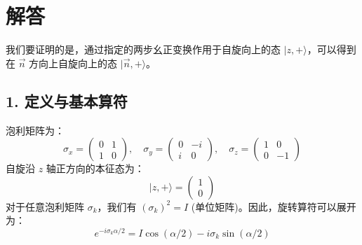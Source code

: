 \documentclass{article}
\begin{document}
\section*{解答}
我们要证明的是，通过指定的两步幺正变换作用于自旋向上的态 \(|z,+\rangle\)，可以得到在 \(\vec{n}\) 方向上自旋向上的态 \(|\vec{n},+\rangle\)。
\subsection*{1. 定义与基本算符}
泡利矩阵为：
\[ \sigma_x = \begin{pmatrix} 0 & 1 \\ 1 & 0 \end{pmatrix}, \quad \sigma_y = \begin{pmatrix} 0 & -i \\ i & 0 \end{pmatrix}, \quad \sigma_z = \begin{pmatrix} 1 & 0 \\ 0 & -1 \end{pmatrix} \]
自旋沿 \(z\) 轴正方向的本征态为：
\[ |z,+\rangle = \begin{pmatrix} 1 \\ 0 \end{pmatrix} \]
对于任意泡利矩阵 \(\sigma_k\)，我们有 \((\sigma_k)^2 = I\) (单位矩阵)。因此，旋转算符可以展开为：
\[ e^{-i\sigma_k \alpha/2} = I \cos(\alpha/2) - i\sigma_k \sin(\alpha/2) \]
\end{document}
